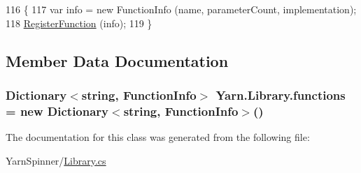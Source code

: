 \begin{DoxyCode}
116                                                                                                \{
117             var info = \textcolor{keyword}{new} FunctionInfo (name, parameterCount, implementation);
118             \hyperlink{a00063_a001ab29d21fe7db10fc9c250914287f9}{RegisterFunction} (info);
119         \}
\end{DoxyCode}


\subsection{Member Data Documentation}
\hypertarget{a00063_a2fcc78a63963be5320cf09783b66fab6}{
\subsubsection[{functions}]{\setlength{\rightskip}{0pt plus 5cm}Dictionary$<$string, {\bf Function\-Info}$>$ Yarn.\-Library.\-functions = new Dictionary$<$string, {\bf Function\-Info}$>$()\hspace{0.3cm}{\ttfamily [private]}}}\label{a00063_a2fcc78a63963be5320cf09783b66fab6}


The documentation for this class was generated from the following file\-:\begin{DoxyCompactItemize}
\item 
Yarn\-Spinner/\hyperlink{a00141}{Library.\-cs}\end{DoxyCompactItemize}
